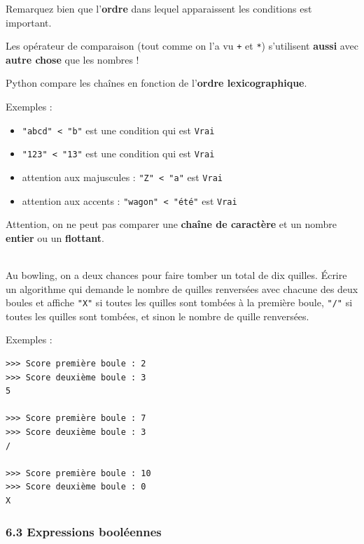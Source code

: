 \documentclass[a4paper,17pt]{extarticle}
\newenvironment{eleve}%
{\begin{activite}\color{noiramu}\\[-0.5cm]}
{\end{activite}}
\providecommand{\tightlist}{%
      \setlength{\itemsep}{0pt}\setlength{\parskip}{0pt}}
\begin{document}
\begin{remarque}
    Remarquez bien que l'\textbf{ordre} dans lequel apparaissent les
conditions est important.

        \end{remarque}\begin{remarque}
    Les opérateur de comparaison (tout comme on l'a vu \texttt{+} et
\texttt{*}) s'utilisent \textbf{aussi} avec \textbf{autre chose} que les
nombres !

Python compare les chaînes en fonction de l'\textbf{ordre
lexicographique}.

Exemples :

\begin{itemize}
\tightlist
\item
  \texttt{"abcd"\ \textless{}\ "b"} est une condition qui est
  \texttt{Vrai}
\item
  \texttt{"123"\ \textless{}\ "13"} est une condition qui est
  \texttt{Vrai}
\item
  attention aux majuscules : \texttt{"Z"\ \textless{}\ "a"} est
  \texttt{Vrai}
\item
  attention aux accents : \texttt{"wagon"\ \textless{}\ "été"} est
  \texttt{Vrai}
\end{itemize}

        \end{remarque}\begin{retenir}
    Attention, on ne peut pas comparer une \textbf{chaîne de caractère} et
un nombre \textbf{entier} ou un \textbf{flottant}.

        \end{retenir}\begin{eleve}
    Au bowling, on a deux chances pour faire tomber un total de dix quilles.
Écrire un algorithme qui demande le nombre de quilles renversées avec
chacune des deux boules et affiche \texttt{"X"} si toutes les quilles
sont tombées à la première boule, \texttt{"/"} si toutes les quilles
sont tombées, et sinon le nombre de quille renversées.

Exemples :

\begin{verbatim}
>>> Score première boule : 2
>>> Score deuxième boule : 3
5

>>> Score première boule : 7
>>> Score deuxième boule : 3
/

>>> Score première boule : 10
>>> Score deuxième boule : 0
X
\end{verbatim}
        
        \end{eleve}
    \hypertarget{expressions-booluxe9ennes}{%
\subsubsection{6.3 Expressions
booléennes}\label{expressions-booluxe9ennes}}
\end{document}
